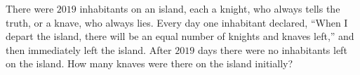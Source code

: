There were $2019$ inhabitants on an island, each a knight, who always tells the truth, or a knave, who always lies. Every day one inhabitant declared, ``When I depart the island, there will be an equal number of knights and knaves left,'' and then immediately left the island. After $2019$ days there were no inhabitants left on the island. How many knaves were there on the island initially?
